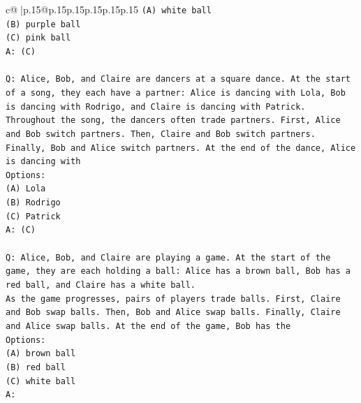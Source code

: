 \documentclass{article}
\begin{document}
{\begin{supertabular}{c@{$\;$}|p{.15\linewidth}@{}p{.15\linewidth}p{.15\linewidth}p{.15\linewidth}p{.15\linewidth}p{.15\linewidth}}
{{{\texttt{(A) white ball} \\
\texttt{(B) purple ball} \\
\texttt{(C) pink ball} \\
\texttt{A: (C)} \\
\\ 
\texttt{Q: Alice, Bob, and Claire are dancers at a square dance. At the start of a song, they each have a partner: Alice is dancing with Lola, Bob is dancing with Rodrigo, and Claire is dancing with Patrick.} \\
\texttt{Throughout the song, the dancers often trade partners. First, Alice and Bob switch partners. Then, Claire and Bob switch partners. Finally, Bob and Alice switch partners. At the end of the dance, Alice is dancing with} \\
\texttt{Options:} \\
\texttt{(A) Lola} \\
\texttt{(B) Rodrigo} \\
\texttt{(C) Patrick} \\
\texttt{A: (C)} \\
\\ 
\texttt{Q: Alice, Bob, and Claire are playing a game. At the start of the game, they are each holding a ball: Alice has a brown ball, Bob has a red ball, and Claire has a white ball.} \\
\texttt{As the game progresses, pairs of players trade balls. First, Claire and Bob swap balls. Then, Bob and Alice swap balls. Finally, Claire and Alice swap balls. At the end of the game, Bob has the} \\
\texttt{Options:} \\
\texttt{(A) brown ball} \\
\texttt{(B) red ball} \\
\texttt{(C) white ball} \\
\texttt{A:} \\
            }
        }
    }
     \\ \\


\end{supertabular}}
\end{document}
